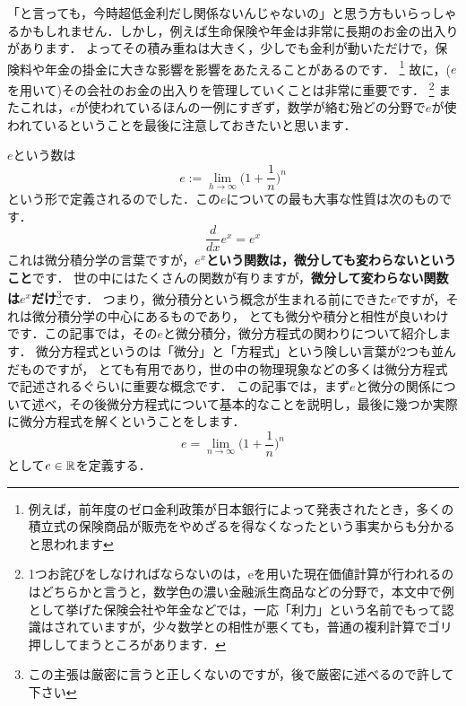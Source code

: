 「と言っても，今時超低金利だし関係ないんじゃないの」と思う方もいらっしゃるかもしれません．しかし，例えば生命保険や年金は非常に長期のお金の出入りがあります．
よってその積み重ねは大きく，少しでも金利が動いただけで，保険料や年金の掛金に大きな影響を影響をあたえることがあるのです．
\footnote{例えば，前年度のゼロ金利政策が日本銀行によって発表されたとき，多くの積立式の保険商品が販売をやめざるを得なくなったという事実からも分かると思われます}
故に，($e$を用いて)その会社のお金の出入りを管理していくことは非常に重要です．
\footnote{1つお詫びをしなければならないのは，eを用いた現在価値計算が行われるのはどちらかと言うと，数学色の濃い金融派生商品などの分野で，本文中で例として挙げた保険会社や年金などでは，一応「利力」という名前でもって認識はされていますが，少々数学との相性が悪くても，普通の複利計算でゴリ押ししてまうところがあります．}
またこれは，$e$が使われているほんの一例にすぎず，数学が絡む殆どの分野で$e$が使われているということを最後に注意しておきたいと思います．

$e$という数は
\[
e := \lim_{h \to \infty} \biggl( 1 + \frac{1}{n}\biggl)^n
\]
という形で定義されるのでした．この$e$についての最も大事な性質は次のものです．
\[
\frac{d}{dx} e^x = e^x
\]
これは微分積分学の言葉ですが，\textbf{$e^x$という関数は，微分しても変わらないということ}です．
世の中にはたくさんの関数が有りますが，\textbf{微分して変わらない関数は$e^x$だけ}\footnote{この主張は厳密に言うと正しくないのですが，後で厳密に述べるので許して下さい}です．
つまり，微分積分という概念が生まれる前にできた$e$ですが，それは微分積分学の中心にあるものであり，
とても微分や積分と相性が良いわけです．この記事では，その$e$と微分積分，微分方程式の関わりについて紹介します．
微分方程式というのは「微分」と「方程式」という険しい言葉が2つも並んだものですが，
とても有用であり，世の中の物理現象などの多くは微分方程式で記述されるぐらいに重要な概念です．
この記事では，まず$e$と微分の関係について述べ，その後微分方程式について基本的なことを説明し，最後に幾つか実際に微分方程式を解くということをします．
\[
e = \lim_{n \to \infty} \biggl( 1 + \frac{1}{n}\biggl)^n
\]
として$e \in \mathbb R$を定義する．

